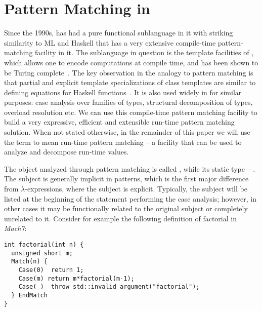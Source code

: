 \section{Pattern Matching in \Cpp{}} %
\label{sec:cpppat}

Since the 1990s, \Cpp{} has had a pure functional sublanguage in it with striking similarity 
to ML and Haskell that has a very extensive compile-time pattern-matching 
facility in it. The sublanguage in question is the template facilities of 
\Cpp{}, which allows one to encode computations at compile time, and has been 
shown to be Turing complete~\cite{veldhuizen:templates_turing_complete}.
The key observation in the analogy to pattern matching is that partial and 
explicit template specializations of \Cpp{} class templates are similar to 
defining equations for Haskell functions~\cite{Milewski11}. It is also used 
widely in \Cpp{} for similar purposes: case analysis over families of types, 
structural decomposition of types, overload resolution etc. We can use this 
compile-time pattern matching facility to build a very expressive, efficient and
extensible run-time pattern matching solution. When not stated otherwise, in the 
remainder of this paper we will use the term  to mean 
run-time pattern matching -- a facility that can be used to analyze and 
decompose run-time values.


The object analyzed through pattern matching is called , while its 
static type -- . The subject is generally implicit in 
patterns, which is the first major difference from $\lambda$-expressions, where 
the subject is explicit. Typically, the subject will be listed at the beginning 
of the statement performing the case analysis; however, in other cases it may be 
functionally related to the original subject or completely unrelated to it. 
Consider for example the following definition of factorial in \emph{Mach7}:

\begin{lstlisting}[keepspaces]
int factorial(int n) {
  unsigned short m;
  Match(n) {
    Case(0)  return 1;
    Case(m) return m*factorial(m-1);
    Case(_)  throw std::invalid_argument("factorial");
  } EndMatch
}
\end{lstlisting}

